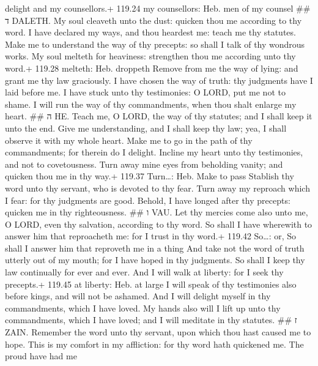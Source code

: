 delight and my counsellors.+ 119.24 my counsellors: Heb. men of my
counsel \#\# ד DALETH.  My soul cleaveth unto the dust:
quicken thou me according to thy word.  I have declared my
ways, and thou heardest me: teach me thy statutes.  Make me
to understand the way of thy precepts: so shall I talk of thy wondrous
works.  My soul melteth for heaviness: strengthen thou me
according unto thy word.+ 119.28 melteth: Heb. droppeth 
Remove from me the way of lying: and grant me thy law graciously.
 I have chosen the way of truth: thy judgments have I laid
before me.  I have stuck unto thy testimonies: O LORD, put
me not to shame.  I will run the way of thy commandments,
when thou shalt enlarge my heart. \#\# ה HE.  Teach me, O
LORD, the way of thy statutes; and I shall keep it unto the end.
 Give me understanding, and I shall keep thy law; yea, I
shall observe it with my whole heart.  Make me to go in the
path of thy commandments; for therein do I delight. 
Incline my heart unto thy testimonies, and not to covetousness.
 Turn away mine eyes from beholding vanity; and quicken
thou me in thy way.+ 119.37 Turn\ldots: Heb. Make to pass 
Stablish thy word unto thy servant, who is devoted to thy fear.
 Turn away my reproach which I fear: for thy judgments are
good.  Behold, I have longed after thy precepts: quicken me
in thy righteousness. \#\# ו VAU.  Let thy mercies come
also unto me, O LORD, even thy salvation, according to thy word.
 So shall I have wherewith to answer him that reproacheth
me: for I trust in thy word.+ 119.42 So\ldots: or, So shall I answer him
that reproveth me in a thing  And take not the word of
truth utterly out of my mouth; for I have hoped in thy judgments.
 So shall I keep thy law continually for ever and ever.
 And I will walk at liberty: for I seek thy precepts.+
119.45 at liberty: Heb. at large  I will speak of thy
testimonies also before kings, and will not be ashamed. 
And I will delight myself in thy commandments, which I have loved.
 My hands also will I lift up unto thy commandments, which
I have loved; and I will meditate in thy statutes. \#\# ז ZAIN.
 Remember the word unto thy servant, upon which thou hast
caused me to hope.  This is my comfort in my affliction:
for thy word hath quickened me.  The proud have had me
